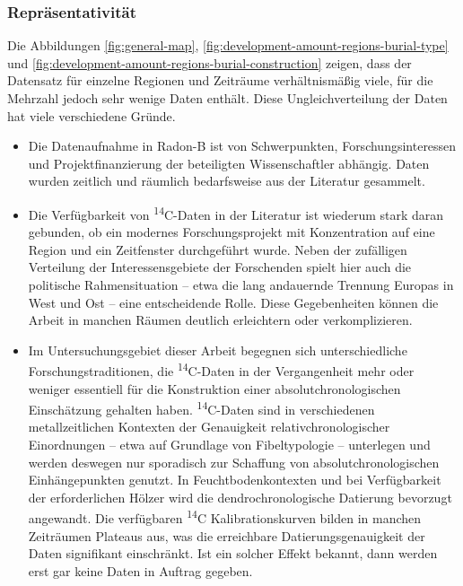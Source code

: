 \documentclass[openany,twoside,twocolumn]{book}
\providecommand{\tightlist}{%
  \setlength{\itemsep}{0pt}\setlength{\parskip}{0pt}}
\begin{document}
\hypertarget{representativity}{%
\subsubsection{Repräsentativität}\label{representativity}}

Die Abbildungen \ref{fig:general-map},
\ref{fig:development-amount-regions-burial-type} und
\ref{fig:development-amount-regions-burial-construction} zeigen, dass
der Datensatz für einzelne Regionen und Zeiträume verhältnismäßig viele,
für die Mehrzahl jedoch sehr wenige Daten enthält. Diese
Ungleichverteilung der Daten hat viele verschiedene Gründe.

\begin{itemize}
\tightlist
\item
  Die Datenaufnahme in Radon-B ist von Schwerpunkten,
  Forschungsinteressen und Projektfinanzierung der beteiligten
  Wissenschaftler abhängig. Daten wurden zeitlich und räumlich
  bedarfsweise aus der Literatur gesammelt.
\item
  Die Verfügbarkeit von \textsuperscript{14}C-Daten in der Literatur ist
  wiederum stark daran gebunden, ob ein modernes Forschungsprojekt mit
  Konzentration auf eine Region und ein Zeitfenster durchgeführt wurde.
  Neben der zufälligen Verteilung der Interessensgebiete der Forschenden
  spielt hier auch die politische Rahmensituation -- etwa die lang
  andauernde Trennung Europas in West und Ost -- eine entscheidende
  Rolle. Diese Gegebenheiten können die Arbeit in manchen Räumen
  deutlich erleichtern oder verkomplizieren.
\item
  Im Untersuchungsgebiet dieser Arbeit begegnen sich unterschiedliche
  Forschungstraditionen, die \textsuperscript{14}C-Daten in der
  Vergangenheit mehr oder weniger essentiell für die Konstruktion einer
  absolutchronologischen Einschätzung gehalten haben.
  \textsuperscript{14}C-Daten sind in verschiedenen metallzeitlichen
  Kontexten der Genauigkeit relativchronologischer Einordnungen -- etwa
  auf Grundlage von Fibeltypologie -- unterlegen und werden deswegen nur
  sporadisch zur Schaffung von absolutchronologischen Einhängepunkten
  genutzt. In Feuchtbodenkontexten und bei Verfügbarkeit der
  erforderlichen Hölzer wird die dendrochronologische Datierung
  bevorzugt angewandt. Die verfügbaren \textsuperscript{14}C
  Kalibrationskurven bilden in manchen Zeiträumen Plateaus aus, was die
  erreichbare Datierungsgenauigkeit der Daten signifikant einschränkt.
  Ist ein solcher Effekt bekannt, dann werden erst gar keine Daten in
  Auftrag gegeben.

\end{itemize}
\end{document}

